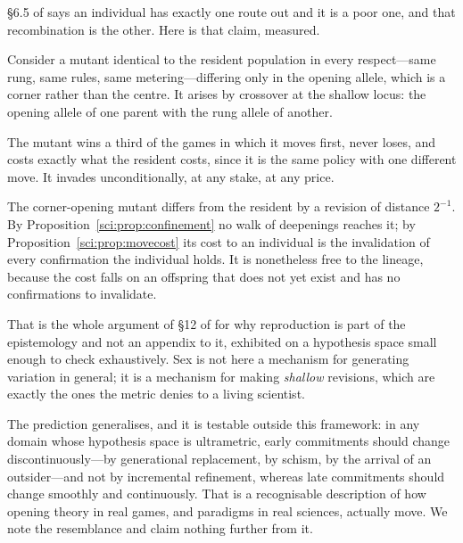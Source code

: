 \S6.5 of \chSci says an individual has exactly one route out and it is
a poor one, and that recombination is the other. Here is that claim, measured.

Consider a mutant identical to the resident population in every respect---same
rung, same rules, same metering---differing only in the opening allele, which is
a corner rather than the centre. It arises by crossover at the shallow locus: the
opening allele of one parent with the rung allele of another.

\begin{center}
\end{center}

The mutant wins a third of the games in which it moves first, never loses, and
costs exactly what the resident costs, since it is the same policy with one
different move. It invades unconditionally, at any stake, at any price.

\begin{proposition}\label{gam:invading-move-one-no}
The corner-opening mutant differs from the resident by a revision of distance
$2^{-1}$. By Proposition~\ref{sci:prop:confinement} no walk of deepenings reaches it; by Proposition~\ref{sci:prop:movecost}
its cost to an individual is the invalidation of every confirmation the
individual holds. It is nonetheless free to the lineage, because the cost falls
on an offspring that does not yet exist and has no confirmations to invalidate.
\end{proposition}

That is the whole argument of \S12 of \chSci for why reproduction is
part of the epistemology and not an appendix to it, exhibited on a hypothesis
space small enough to check exhaustively. Sex is not here a mechanism for
generating variation in general; it is a mechanism for making \emph{shallow}
revisions, which are exactly the ones the metric denies to a living scientist.

\begin{remark}\label{gam:opening-theory-changes-catastrophe}
The prediction generalises, and it is testable outside this framework: in any
domain whose hypothesis space is ultrametric, early commitments should change
discontinuously---by generational replacement, by schism, by the arrival of an
outsider---and not by incremental refinement, whereas late commitments should
change smoothly and continuously. That is a recognisable description of how
opening theory in real games, and paradigms in real sciences, actually move. We
note the resemblance and claim nothing further from it.
\end{remark}

